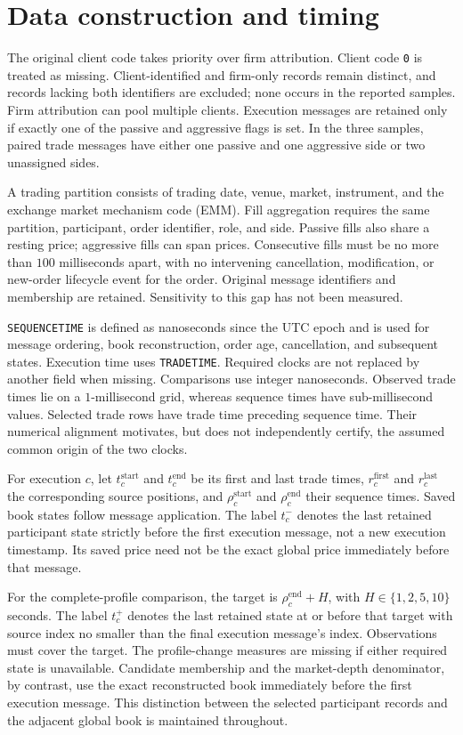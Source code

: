 \section{Data construction and timing}
\label{sec:data_details}
The original client code takes priority over firm attribution. Client code \texttt{0} is treated as missing. Client-identified and firm-only records remain distinct, and records lacking both identifiers are excluded; none occurs in the reported samples. Firm attribution can pool multiple clients. Execution messages are retained only if exactly one of the passive and aggressive flags is set. In the three samples, paired trade messages have either one passive and one aggressive side or two unassigned sides.

A trading partition consists of trading date, venue, market, instrument, and the exchange market mechanism code (EMM). Fill aggregation requires the same partition, participant, order identifier, role, and side. Passive fills also share a resting price; aggressive fills can span prices. Consecutive fills must be no more than $100$ milliseconds apart, with no intervening cancellation, modification, or new-order lifecycle event for the order. Original message identifiers and membership are retained. Sensitivity to this gap has not been measured.

\texttt{SEQUENCETIME} is defined as nanoseconds since the UTC epoch and is used for message ordering, book reconstruction, order age, cancellation, and subsequent states. Execution time uses \texttt{TRADETIME}. Required clocks are not replaced by another field when missing. Comparisons use integer nanoseconds. Observed trade times lie on a $1$-millisecond grid, whereas sequence times have sub-millisecond values. Selected trade rows have trade time preceding sequence time. Their numerical alignment motivates, but does not independently certify, the assumed common origin of the two clocks.

For execution $c$, let $t_c^{\mathrm{start}}$ and $t_c^{\mathrm{end}}$ be its first and last trade times, $r_c^{\mathrm{first}}$ and $r_c^{\mathrm{last}}$ the corresponding source positions, and $\rho_c^{\mathrm{start}}$ and $\rho_c^{\mathrm{end}}$ their sequence times. Saved book states follow message application. The label $t_c^{-}$ denotes the last retained participant state strictly before the first execution message, not a new execution timestamp. Its saved price need not be the exact global price immediately before that message.

For the complete-profile comparison, the target is $\rho_c^{\mathrm{end}}+H$, with $H\in\{1,2,5,10\}$ seconds. The label $t_c^{+}$ denotes the last retained state at or before that target with source index no smaller than the final execution message's index. Observations must cover the target. The profile-change measures are missing if either required state is unavailable. Candidate membership and the market-depth denominator, by contrast, use the exact reconstructed book immediately before the first execution message. This distinction between the selected participant records and the adjacent global book is maintained throughout.


